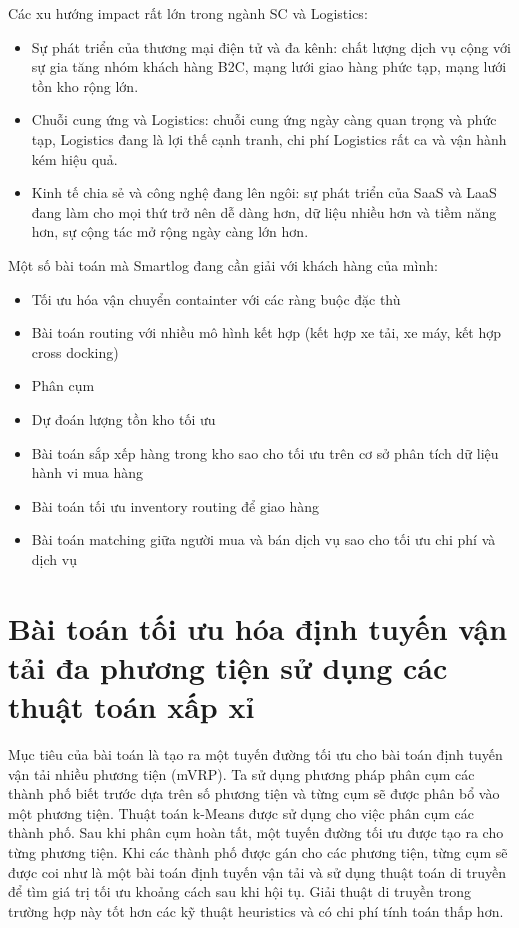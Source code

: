 \documentclass[14pt, a4paper]{article}
\numberwithin{equation}{section}
\numberwithin{figure}{section}
\numberwithin{dl}{section}
\numberwithin{md}{section}
\numberwithin{bd}{section}
\numberwithin{dn}{section}
\numberwithin{hq}{section}
\begin{document}
    Các xu hướng impact rất lớn trong ngành SC và Logistics:

    \begin{itemize}
        \item Sự phát triển của thương mại điện tử và đa kênh: chất lượng dịch vụ cộng với sự gia tăng nhóm khách hàng B2C, mạng lưới giao hàng phức tạp, mạng lưới tồn kho rộng lớn.
        \item Chuỗi cung ứng và Logistics: chuỗi cung ứng ngày càng quan trọng và phức tạp, Logistics đang là lợi thế cạnh tranh, chi phí Logistics rất ca và vận hành kém hiệu quả.
        \item Kinh tế chia sẻ và công nghệ đang lên ngôi: sự phát triển của SaaS và LaaS đang làm cho mọi thứ trở nên dễ dàng hơn, dữ liệu nhiều hơn và tiềm năng hơn, sự cộng tác mở rộng ngày càng lớn hơn.
    \end{itemize}

    Một số bài toán mà Smartlog đang cần giải với khách hàng của mình:

    \begin{itemize}
        \item Tối ưu hóa vận chuyển containter với các ràng buộc đặc thù
        \item Bài toán routing với nhiều mô hình kết hợp (kết hợp xe tải, xe máy, kết hợp cross docking)
        \item Phân cụm
        \item Dự đoán lượng tồn kho tối ưu
        \item Bài toán sắp xếp hàng trong kho sao cho tối ưu trên cơ sở phân tích dữ liệu hành vi mua hàng
        \item Bài toán tối ưu inventory routing để giao hàng
        \item Bài toán matching giữa người mua và bán dịch vụ sao cho tối ưu chi phí và dịch vụ
    \end{itemize}

    \section{Bài toán tối ưu hóa định tuyến vận tải đa phương tiện sử dụng các thuật toán xấp xỉ}

    Mục tiêu của bài toán là tạo ra một tuyến đường tối ưu cho bài toán định tuyến vận tải nhiều phương tiện (mVRP).
    Ta sử dụng phương pháp phân cụm các thành phố biết trước dựa trên số phương tiện và từng cụm sẽ được phân bổ vào một phương tiện.
    Thuật toán k-Means được sử dụng cho việc phân cụm các thành phố.
    Sau khi phân cụm hoàn tất, một tuyến đường tối ưu được tạo ra cho từng phương tiện.
    Khi các thành phố được gán cho các phương tiện, từng cụm sẽ được coi như là một bài toán định tuyến vận tải và sử dụng thuật toán di truyền để tìm giá trị tối ưu khoảng cách sau khi hội tụ.
    Giải thuật di truyền trong trường hợp này tốt hơn các kỹ thuật heuristics và có chi phí tính toán thấp hơn.
\end{document}
